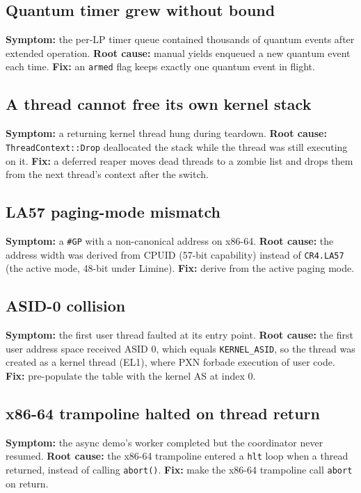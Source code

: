 \subsection{Quantum timer grew without bound}

\textbf{Symptom:} the per-LP timer queue contained thousands of quantum events
after extended operation. \textbf{Root cause:} manual yields enqueued a new
quantum event each time. \textbf{Fix:} an \texttt{armed} flag keeps exactly one
quantum event in flight.

\subsection{A thread cannot free its own kernel stack}

\textbf{Symptom:} a returning kernel thread hung during teardown. \textbf{Root
cause:} \texttt{ThreadContext::Drop} deallocated the stack while the thread was
still executing on it. \textbf{Fix:} a deferred reaper moves dead threads to a
zombie list and drops them from the next thread's context after the switch.

\subsection{LA57 paging-mode mismatch}

\textbf{Symptom:} a \texttt{\#GP} with a non-canonical address on x86-64.
\textbf{Root cause:} the address width was derived from CPUID (57-bit capability)
instead of \texttt{CR4.LA57} (the active mode, 48-bit under Limine). \textbf{Fix:}
derive from the active paging mode.

\subsection{ASID-0 collision}

\textbf{Symptom:} the first user thread faulted at its entry point. \textbf{Root
cause:} the first user address space received ASID 0, which equals
\texttt{KERNEL\_ASID}, so the thread was created as a kernel thread (EL1),
where PXN forbade execution of user code. \textbf{Fix:} pre-populate the table
with the kernel AS at index 0.

\subsection{x86-64 trampoline halted on thread return}

\textbf{Symptom:} the async demo's worker completed but the coordinator never
resumed. \textbf{Root cause:} the x86-64 trampoline entered a \texttt{hlt} loop
when a thread returned, instead of calling \texttt{abort()}. \textbf{Fix:} make
the x86-64 trampoline call \texttt{abort} on return.


